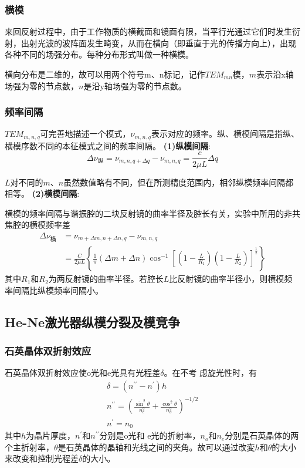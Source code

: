 \documentclass[UTF8]{ctexart}
\begin{document}
\begin{multicols}{2}
\subsubsection{横模}
来回反射过程中，由于工作物质的横截面和镜面有限，当平行光通过它们时发生衍射，出射光波的波阵面发生畸变，从而在横向（即垂直于光的传播方向上），出现各种不同的场强分布。每种分布形式叫做一种横模。

横向分布是二维的，故可以用两个符号m、n标记，记作$TEM_{mn}$模，$m$表示沿x轴场强为零的节点数，$n$是沿y轴场强为零的节点数。

\subsubsection{频率间隔}
$TEM_{m,n,q}$可完善地描述一个模式，$\nu_{m, n, q}$表示对应的频率。纵、横模间隔是指纵、横模序数不同的本征模式之间的频率间隔。
\newline\textbf{(1)纵模间隔}:
\begin{equation}
\Delta \nu_{\mbox{纵}}=\nu_{m, n, q+\Delta q}-\nu_{m, n, q}=\frac{c}{2 \mu L} \Delta q
\end{equation}

$L$对不同的$m$、$n$虽然数值略有不同，但在所测精度范围内，相邻纵模频率间隔都相等。
\newline\textbf{(2)横模间隔}:

横模的频率间隔与谐振腔的二块反射镜的曲率半径及腔长有关，实验中所用的非共焦腔的横模频率差
\begin{equation}
\begin{aligned}
\Delta \nu_{\mbox{横}}&=\nu_{m+\Delta m, n+\Delta n, q}-\nu_{m, n, q}\\
&=\frac{C}{2 \mu L}\left\{\frac{1}{\pi}(\Delta m+\Delta n) \cos ^{-1}\left[\left(1-\frac{L}{R_{1}}\right)\left(1-\frac{L}{R_{2}}\right)\right]^{\frac{1}{2}}\right\}
\end{aligned}
\end{equation}
其中$R_{1}$和$R_{2}$为两反射镜的曲率半径。若腔长$L$比反射镜的曲率半径小，则横模频率间隔比纵模频率间隔小。

\subsection{He-Ne激光器纵模分裂及模竞争}
\subsubsection{石英晶体双折射效应}
石英晶体双折射效应使o光和e光具有光程差$\delta$。在不考
虑旋光性时，有
\begin{equation}
\begin{array}{l}{\delta=\left(n^{\prime \prime}-n^{\prime}\right) h} \\ {n^{\prime \prime}=\left(\frac{\sin ^{2} \theta}{n_{e}^{2}}+\frac{\cos ^{2} \theta}{n_{o}^{2}}\right)^{-1 / 2}} \\ {n^{\prime}=n_{0}}\end{array}
\end{equation}
其中$h$为晶片厚度，$n^{\prime}$和$n^{\prime \prime}$分别是o光和
e光的折射率，$n_{o}$和$n_{e}$分别是石英晶体的两个主折射率，$\theta$是石英晶体的晶轴和光线之间的夹角。故可以通过改変$h$和$\theta$的大小来改变和控制光程差$\delta$的大小。

\end{multicols}
\end{document}
